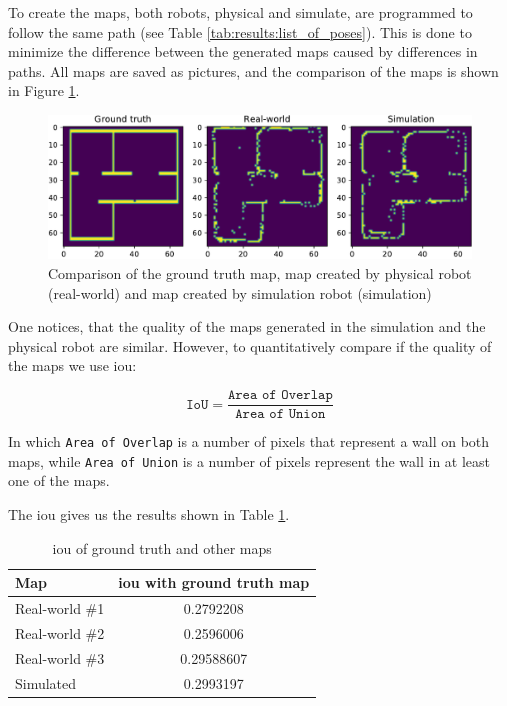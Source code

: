 To create the maps, both robots, physical and simulate, are programmed to follow the same path (see Table \ref{tab:results:list_of_poses}).
This is done to minimize the difference between the generated maps caused by differences in paths.
All maps are saved as pictures, and the comparison of the maps is shown in Figure \ref{fig:results:map_comparison}.

\begin{figure}[H]
    \centering
    \includegraphics[width=\textwidth]{./results/figures/map_comparison.pdf}
    \caption{Comparison of the ground truth map, map created by physical robot (real-world) and map created by simulation robot (simulation)}
    \label{fig:results:map_comparison}
\end{figure}

One notices, that the quality of the maps generated in the simulation and the physical robot are similar.
However, to quantitatively compare if the quality of the maps we use \ac{iou}:

\begin{equation}
    \texttt{IoU} = \frac{\texttt{Area of Overlap}}{\texttt{Area of Union}}
\end{equation}

In which \texttt{Area of Overlap} is a number of pixels that represent a wall on both maps, while \texttt{Area of Union} is a number of pixels represent the wall in at least one of the maps.

The \ac{iou} gives us the results shown in Table \ref{tab:results:map_iou}.

\begin{table}[H]
    \centering
    \begin{tabular}{|l|c|}
        \hline
        \textbf{Map} & \textbf{\acs{iou} with ground truth map} \\
        \hline
        Real-world \#1 & 0.2792208 \\
        \hline
        Real-world \#2 & 0.2596006 \\
        \hline
        Real-world \#3 & 0.29588607 \\
        \hline
        Simulated & 0.2993197 \\
        \hline
    \end{tabular}
    \caption{\ac{iou} of ground truth and other maps}
    \label{tab:results:map_iou}
\end{table}

